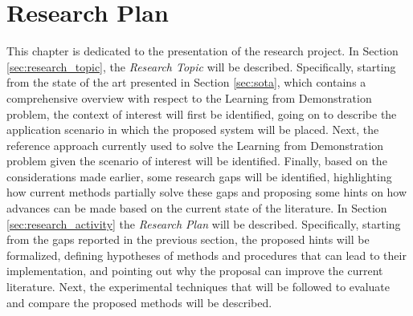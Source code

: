 \chapter{Research Plan}
\label{chapter:research_plan}
This chapter is dedicated to the presentation of the research project. In Section \ref{sec:research_topic}, the \textit{Research Topic} will be described. Specifically, starting from the state of the art presented in Section \ref{sec:sota}, which contains a comprehensive overview with respect to the Learning from Demonstration problem, the context of interest will first be identified, going on to describe the application scenario in which the proposed system will be placed. Next, the reference approach currently used to solve the Learning from Demonstration problem given the scenario of interest will be identified. Finally, based on the considerations made earlier, some research gaps will be identified, highlighting how current methods partially solve these gaps and proposing some hints on how advances can be made based on the current state of the literature.
In Section \ref{sec:research_activity} the \textit{Research Plan} will be described. Specifically, starting from the gaps reported in the previous section, the proposed hints will be formalized, defining hypotheses of methods and procedures that can lead to their implementation, and pointing out why the proposal can improve the current literature. Next, the experimental techniques that will be followed to evaluate and compare the proposed methods will be described. 


